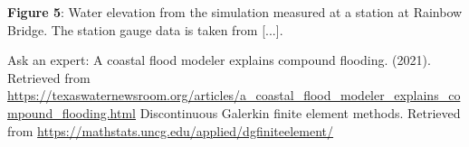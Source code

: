 \documentclass[american]{article}
\begin{document}
\begin{multicols}{3}
\begin{center}
    \textbf{Figure 5}: Water elevation from the simulation measured at a station at Rainbow Bridge. The station gauge data is taken from [...].
\end{center}


\begin{thebibliography}{2}
  Ask an expert: A coastal flood modeler explains compound flooding. (2021). Retrieved from \url{https://texaswaternewsroom.org/articles/a_coastal_flood_modeler_explains_compound_flooding.html}
  Discontinuous Galerkin finite element methods. Retrieved from \url{https://mathstats.uncg.edu/applied/dgfiniteelement/}
\end{thebibliography}



\end{multicols}
\end{document}
